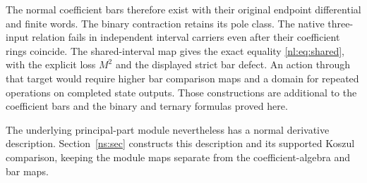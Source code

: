 The normal coefficient bars therefore exist with their original
endpoint differential and finite words. The binary contraction retains
its pole class. The native three-input relation fails in independent
interval carriers even after their coefficient rings coincide.
The shared-interval map gives the exact equality \eqref{nl:eq:shared},
with the explicit loss \(M^2\) and the displayed strict bar defect.
An action through that target would require higher bar comparison maps
and a domain for repeated operations on completed state outputs.
Those constructions are additional to the coefficient bars and the
binary and ternary formulas proved here.

The underlying principal-part module nevertheless has a normal
derivative description.  Section~\ref{ns:sec} constructs this
description and its supported Koszul comparison, keeping the
module maps separate from the coefficient-algebra and bar maps.
